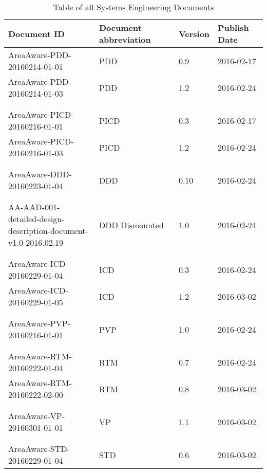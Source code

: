 \begin{table}[h]
    \centering
    \label{tab:baseline2}
    \begin{tabular}{llll}
    \textbf{Document ID} & \textbf{Document abbreviation} & \textbf{Version} & \textbf{Publish Date} \\ \hline
    AreaAware-PDD-20160214-01-01 & PDD & 0.9 & 2016-02-17 \\ \hline
    AreaAware-PDD-20160214-01-03 & PDD & 1.2 & 2016-02-24 \\ \hline
    &  &  &  \\
    &  &  &  \\
    AreaAware-PICD-20160216-01-01 & PICD & 0.3 & 2016-02-17 \\ \hline
    AreaAware-PICD-20160216-01-03 & PICD & 1.2 & 2016-02-24 \\ \hline
    &  &  &  \\
    &  &  &  \\
    AreaAware-DDD-20160223-01-04 & DDD & 0.10 & 2016-02-24 \\ \hline
    &  &  &  \\
    &  &  &  \\
    \makecell[l]{AA-AAD-001-\\detailed-design-description-document-\\v1.0-2016.02.19} & DDD Dismounted & 1.0 & 2016-02-24 \\ \hline
    &  &  &  \\
    &  &  &  \\
    AreaAware-ICD-20160229-01-04 & ICD & 0.3 & 2016-02-24 \\ \hline
    AreaAware-ICD-20160229-01-05 & ICD & 1.2 & 2016-03-02 \\ \hline
    &  &  &  \\
    &  &  &  \\
    AreaAware-PVP-20160216-01-01 & PVP & 1.0 & 2016-02-24 \\ \hline
    &  &  &  \\
    &  &  &  \\
    AreaAware-RTM-20160222-01-04 & RTM & 0.7 & 2016-02-24 \\ \hline
    AreaAware-RTM-20160222-02-00 & RTM & 0.8 & 2016-03-02 \\ \hline
    &  &  &  \\
    &  &  &  \\
    AreaAware-VP-20160301-01-01 & VP & 1.1 & 2016-03-02 \\ \hline
    &  &  &  \\
    &  &  &  \\
    AreaAware-STD-20160229-01-04 & STD & 0.6 & 2016-03-02 \\ \hline
    \end{tabular}
    \caption{Table of all Systems Engineering Documents}
\end{table}



